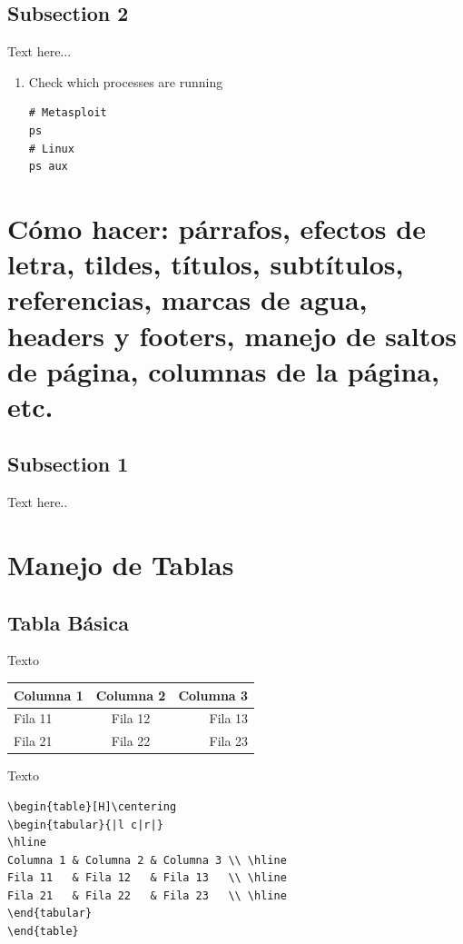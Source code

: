 \documentclass[letterpaper, 10pt, journal]{IEEEtran}
\begin{document}
\subsection{Subsection 2}
Text here...
\begin{enumerate}
\item Check which processes are running
\lstset{language=Java}
\begin{lstlisting}
# Metasploit
ps
# Linux
ps aux
\end{lstlisting}
\end{enumerate}


\section{C\'omo hacer: p\'arrafos, efectos de letra, tildes, t\'itulos, subt\'itulos, referencias, marcas de agua, headers y footers, manejo de saltos de p\'agina, columnas de la p\'agina, etc.}
\subsection{Subsection 1}
Text here..

\section{Manejo de Tablas}
\subsection{Tabla B\'asica}
Texto
\begin{table}[H]\centering
\begin{tabular}{|l c|r|}
\hline
Columna 1 & Columna 2 & Columna 3 \\ \hline
Fila 11   & Fila 12   & Fila 13   \\ \hline
Fila 21   & Fila 22   & Fila 23   \\ \hline
\end{tabular}
\end{table}

Texto
\lstset{language=Java}
\begin{lstlisting}
\begin{table}[H]\centering
\begin{tabular}{|l c|r|}
\hline
Columna 1 & Columna 2 & Columna 3 \\ \hline
Fila 11   & Fila 12   & Fila 13   \\ \hline
Fila 21   & Fila 22   & Fila 23   \\ \hline
\end{tabular}
\end{table}
\end{lstlisting}
\end{document}
